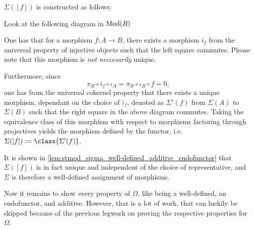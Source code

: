 \begin{remark}
    \label{rem:stmod_sigma_f}
    \( \Sigma([f]) \) is constructed as follows:

    Look at the following diagram in \( \operatorname{Mod}(R) \)
    \begin{center}
    \end{center}

    One has that for a morphism \( f: A \to B \), there exists a morphism \( i_f \) from the universal property of injective objects such that the left square commutes. Please note that this morphism is \emph{not neccesarily} unique.

    Furthermore, since
    \[
        \pi_B \circ i_f \circ \iota_A = \pi_B \circ \iota_B \circ f = 0,
    \]
    one has from the universal cokernel property that there exists a unique morphism, dependant on the choice of \( i_f \), denoted as \( \Sigma'(f) \) from \( \Sigma(A) \) to \( \Sigma(B) \) such that the right square in the above diagram commutes. Taking the equivalence class of this morphism with respect to morphisms factoring through projectives yields the morphism defined by the functor, i.e. \( \Sigma([f]) := \class{\Sigma'(f)} \).

    It is shown in \autoref{lem:stmod_sigma_well-defined_additive_endofunctor} that \( \Sigma([f]) \) is in fact unique and independent of the choice of representative, and \( \Sigma \) is therefore a well-defined assignment of morphisms.
\end{remark}

Now it remains to show every property of \( \Omega \), like being a well-defined, an endofunctor, and additive. However, that is a lot of work, that can luckily be skipped because of the previous legwork on proving the respective properties for \( \Omega \).

